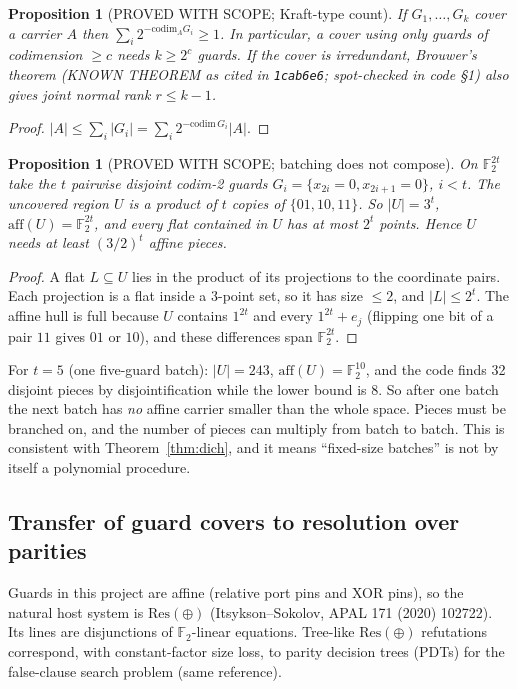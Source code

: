\documentclass[11pt]{article}
\newtheorem{proposition}[theorem]{Proposition}
\theoremstyle{definition}
\newcommand{\F}{\mathbb{F}_2}
\newcommand{\Resx}{\mathrm{Res}(\oplus)}
\begin{document}
\begin{proposition}[PROVED WITH SCOPE; Kraft-type count]\label{prop:kraft}
If $G_1,\dots,G_k$ cover a carrier $A$ then $\sum_i2^{-\mathrm{codim}_A G_i}\ge 1$. In particular, a cover using only guards of codimension $\ge c$ needs $k\ge 2^c$ guards. If the cover is irredundant, Brouwer's theorem (KNOWN THEOREM as cited in \texttt{1cab6e6}; spot-checked in code \S1) also gives joint normal rank $r\le k-1$.
\end{proposition}
\begin{proof}
$|A|\le\sum_i|G_i|=\sum_i 2^{-\mathrm{codim}\,G_i}|A|$.
\end{proof}

\begin{proposition}[PROVED WITH SCOPE; batching does not compose]\label{prop:batch}
On $\F^{2t}$ take the $t$ pairwise disjoint codim-2 guards $G_i=\{x_{2i}=0,x_{2i+1}=0\}$, $i<t$. The uncovered region $U$ is a product of $t$ copies of $\{01,10,11\}$. So $|U|=3^t$, $\mathrm{aff}(U)=\F^{2t}$, and every flat contained in $U$ has at most $2^t$ points. Hence $U$ needs at least $(3/2)^t$ affine pieces.
\end{proposition}
\begin{proof}
A flat $L\subseteq U$ lies in the product of its projections to the coordinate pairs. Each projection is a flat inside a 3-point set, so it has size $\le 2$, and $|L|\le 2^t$. The affine hull is full because $U$ contains $1^{2t}$ and every $1^{2t}+e_j$ (flipping one bit of a pair $11$ gives $01$ or $10$), and these differences span $\F^{2t}$.
\end{proof}
For $t=5$ (one five-guard batch): $|U|=243$, $\mathrm{aff}(U)=\F^{10}$, and the code finds 32 disjoint pieces by disjointification while the lower bound is 8. So after one batch the next batch has \emph{no} affine carrier smaller than the whole space. Pieces must be branched on, and the number of pieces can multiply from batch to batch. This is consistent with Theorem~\ref{thm:dich}, and it means ``fixed-size batches'' is not by itself a polynomial procedure.

\subsection{Transfer of guard covers to resolution over parities}
Guards in this project are affine (relative port pins and XOR pins), so the natural host system is $\Resx$ (Itsykson--Sokolov, APAL 171 (2020) 102722). Its lines are disjunctions of $\F$-linear equations. Tree-like $\Resx$ refutations correspond, with constant-factor size loss, to parity decision trees (PDTs) for the false-clause search problem (same reference).
\end{document}
